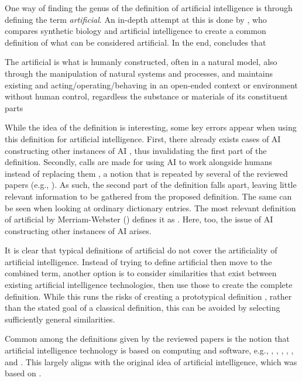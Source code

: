 One way of finding the genus of the definition of artificial intelligence is through defining the term \textit{artificial}. An in-depth attempt at this is done by \parencite{Bianchini_2021}, who compares synthetic biology and artificial intelligence to create a common definition of what can be considered artificial. In the end, \citeauthor{Bianchini_2021} concludes that
\begin{displayquote}
    The artificial is what is humanly constructed, often in a natural model, also through the manipulation of natural systems and processes, and maintains existing and acting/operating/behaving in an open-ended context or environment without human control, regardless the substance or materials of its constituent parts
\end{displayquote}
While the idea of the definition is interesting, some key errors appear when using this definition for artificial intelligence. First, there already exists cases of AI constructing other instances of AI \parencite{AI_making_AI}, thus invalidating the first part of the definition. Secondly, calls are made for using AI to work alongside humans instead of replacing them \parencite{AI_alongside}, a notion that is repeated by several of the reviewed papers (e.g., \cite{Vetro_2019,Wang_2021,Doorn_2021,Brand_2022,Havrda_2020}). As such, the second part of the definition falls apart, leaving little relevant information to be gathered from the proposed definition. The same can be seen when looking at ordinary dictionary entries. The most relevant definition of artificial by Merriam-Webster (\cite{dictionary_artificial}) defines it as . Here, too, the issue of AI constructing other instances of AI arises.

It is clear that typical definitions of artificial do not cover the artificiality of artificial intelligence. Instead of trying to define artificial then move to the combined term, another option is to consider similarities that exist between existing artificial intelligence technologies, then use those to create the complete definition. While this runs the risks of creating a prototypical definition \parencite[p. 36]{Seppälä_2014}, rather than the stated goal of a classical definition, this can be avoided by selecting sufficiently general similarities.

Common among the definitions given by the reviewed papers is the notion that artificial intelligence technology is based on computing and software, e.g.,  \parencite[p. 1]{Siala_2022},  \parencite[p. 130]{Brand_2022},  \parencite[p. 2]{Dignum_2021},  \parencite[p. 1]{Havrda_2020},  \parencite[p. 3]{Liu_2021}, and  \parencite[p. 1]{Lukkien_2021}. This largely aligns with the original idea of artificial intelligence, which was based on  \parencite[p. 87]{Moor_2006}.

